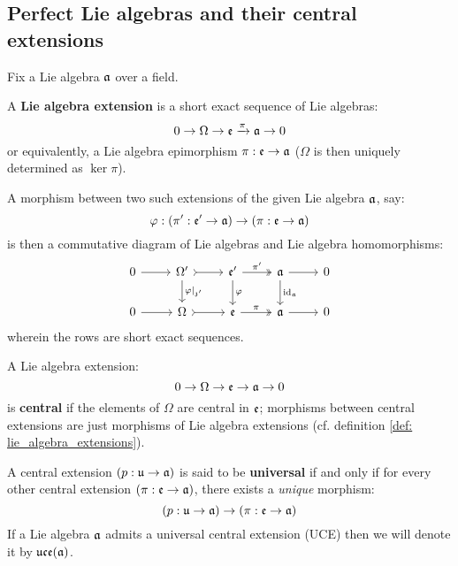     \subsection{Perfect Lie algebras and their central extensions}
        \begin{definition} \label{def: lie_algebra_extensions}
            Fix a Lie algebra $\mathfrak{a}$ over a field.
        
            A \textbf{Lie algebra extension} is a short exact sequence of Lie algebras:
                $$0 \to \Omega \to \mathfrak{e} \xrightarrow[]{\pi} \mathfrak{a} \to 0$$
            or equivalently, a Lie algebra epimorphism $\pi: \mathfrak{e} \to \mathfrak{a}$ ($\Omega$ is then uniquely determined as $\ker \pi$). 
            
            A morphism between two such extensions of the given Lie algebra $\mathfrak{a}$, say:
                $$\varphi: (\pi': \mathfrak{e}' \to \mathfrak{a}) \to (\pi: \mathfrak{e} \to \mathfrak{a})$$
            is then a commutative diagram of Lie algebras and Lie algebra homomorphisms:
                $$
                    \begin{tikzcd}
                	0 & {\Omega'} & {\frake'} & \a & 0 \\
                	0 & \Omega & \frake & \a & 0
                	\arrow["{\varphi|_{\z'}}", from=1-2, to=2-2]
                	\arrow["\varphi", from=1-3, to=2-3]
                	\arrow["{\id_{\a}}", from=1-4, to=2-4]
                	\arrow[from=1-1, to=1-2]
                	\arrow[tail, from=1-2, to=1-3]
                	\arrow["{\pi'}", two heads, from=1-3, to=1-4]
                	\arrow[from=1-4, to=1-5]
                	\arrow[from=2-1, to=2-2]
                	\arrow[tail, from=2-2, to=2-3]
                	\arrow["\pi", two heads, from=2-3, to=2-4]
                	\arrow[from=2-4, to=2-5]
                    \end{tikzcd}
                $$
            wherein the rows are short exact sequences.
        \end{definition}
        \begin{definition}
            A Lie algebra extension:
                $$0 \to \Omega \to \mathfrak{e} \to \mathfrak{a} \to 0$$
            is \textbf{central} if the elements of $\Omega$ are central in $\mathfrak{e}$; morphisms between central extensions are just morphisms of Lie algebra extensions (cf. definition \ref{def: lie_algebra_extensions}).
            
            A central extension $(p: \mathfrak{u} \to \mathfrak{a})$ is said to be \textbf{universal} if and only if for every other central extension $(\pi: \mathfrak{e} \to \mathfrak{a})$, there exists a \textit{unique} morphism:
                $$(p: \mathfrak{u} \to \mathfrak{a}) \to (\pi: \mathfrak{e} \to \mathfrak{a})$$
            If a Lie algebra $\mathfrak{a}$ admits a universal central extension (UCE) then we will denote it by $\mathfrak{uce}(\mathfrak{a})$.
        \end{definition}
